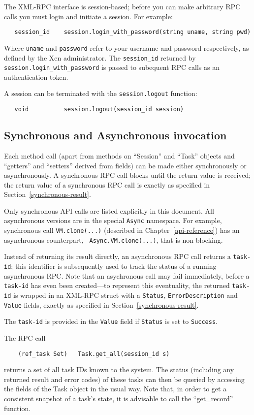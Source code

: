 The XML-RPC interface is session-based; before you can make arbitrary RPC calls
you must login and initiate a session. For example:
\begin{verbatim}
   session_id    session.login_with_password(string uname, string pwd)
\end{verbatim}
Where {\tt uname} and {\tt password} refer to your username and password
respectively, as defined by the Xen administrator.
The {\tt session\_id} returned by {\tt session.login\_with\_password} is passed
to subequent RPC calls as an authentication token.

A session can be terminated with the {\tt session.logout} function:
\begin{verbatim}
   void          session.logout(session_id session)
\end{verbatim}

\subsection{Synchronous and Asynchronous invocation}

Each method call (apart from methods on ``Session'' and ``Task'' objects 
and ``getters'' and ``setters'' derived from fields)
can be made either synchronously or asynchronously.
A synchronous RPC call blocks until the
return value is received; the return value of a synchronous RPC call is
exactly as specified in Section~\ref{synchronous-result}.

Only synchronous API calls are listed explicitly in this document. 
All asynchronous versions are in the special {\tt Async} namespace.
For example, synchronous call {\tt VM.clone(...)}
(described in Chapter~\ref{api-reference})
has an asynchronous counterpart, {\tt
Async.VM.clone(...)}, that is non-blocking.

Instead of returning its result directly, an asynchronous RPC call
returns a {\tt task-id}; this identifier is subsequently used
to track the status of a running asynchronous RPC. Note that an asychronous
call may fail immediately, before a {\tt task-id} has even been created---to
represent this eventuality, the returned {\tt task-id}
is wrapped in an XML-RPC struct with a {\tt Status}, {\tt ErrorDescription} and
{\tt Value} fields, exactly as specified in Section~\ref{synchronous-result}.

The {\tt task-id} is provided in the {\tt Value} field if {\tt Status} is set to
{\tt Success}.

The RPC call
\begin{verbatim}
    (ref_task Set)   Task.get_all(session_id s)
\end{verbatim} 
returns a set of all task IDs known to the system. The status (including any
returned result and error codes) of these tasks
can then be queried by accessing the fields of the Task object in the usual way. 
Note that, in order to get a consistent snapshot of a task's state, it is advisable to call the ``get\_record'' function.

